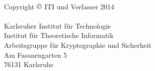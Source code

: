 \thispagestyle{empty}
\ \vfill
\begin{flushleft}
  Copyright $\copyright$ ITI und Verfasser 2014\\
  \ \\
  Karlsruher Institut für Technologie\\
  Institut für Theoretische Informatik\\
  Arbeitsgruppe für Kryptographie und Sicherheit\\
  Am Fasanengarten 5\\
  76131 Karlsruhe
\end{flushleft}
\newpage

